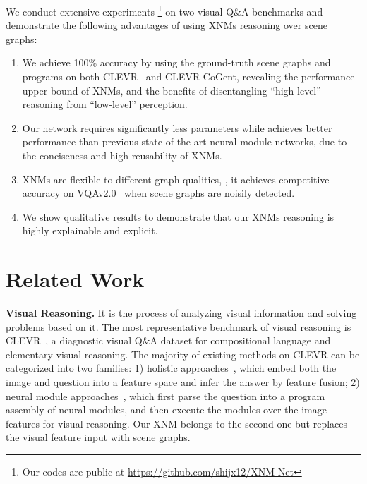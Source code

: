 \documentclass[10pt,twocolumn,letterpaper]{article}
\begin{document}
We conduct extensive experiments \footnote{Our codes are public at \url{https://github.com/shijx12/XNM-Net}}
on two visual Q\&A benchmarks and demonstrate the following advantages of using XNMs reasoning over scene graphs:
\begin{enumerate}[leftmargin=.2in,itemsep=0pt,parsep=0pt,topsep=1pt, partopsep=0pt]
    \item We achieve 100\% accuracy by using the ground-truth scene graphs and programs on both CLEVR~\cite{johnson2017clevr} and CLEVR-CoGent, revealing the performance upper-bound of XNMs, and the benefits of disentangling ``high-level'' reasoning from ``low-level'' perception.
    \item Our network requires significantly less parameters while achieves better performance than previous state-of-the-art neural module networks, due to the conciseness and high-reusability of XNMs.
    \item XNMs are flexible to different graph qualities, \eg,  it achieves competitive accuracy on VQAv2.0~\cite{goyal2017vqa2} when scene graphs are noisily detected.
    \item We show qualitative results to demonstrate that our XNMs reasoning is highly explainable and explicit.
\end{enumerate}


\vspace{-0.2cm}
\section{Related Work}
\vspace{-0.1cm}
\textbf{Visual Reasoning.}
It is the process of analyzing visual information and solving problems based on it. The most representative benchmark of visual reasoning is CLEVR~\cite{johnson2017clevr}, a diagnostic visual Q\&A dataset for compositional language and elementary visual reasoning. The majority of existing methods on CLEVR can be categorized into two families: 
1) holistic approaches~\cite{johnson2017clevr,santoro2017simple,perez2017film,hudson2018compositional}, which embed both the image and question into a feature space and infer the answer by feature fusion;
2) neural module approaches~\cite{andreas2016neural,hu2017learning,johnson2017inferring,mascharka2018transparency,hu2018explainable,yi2018nsvqa}, which first parse the question into a program assembly of neural modules, and then execute the modules over the image features for visual reasoning. Our XNM belongs to the second one but replaces the visual feature input with scene graphs. 
\end{document}
